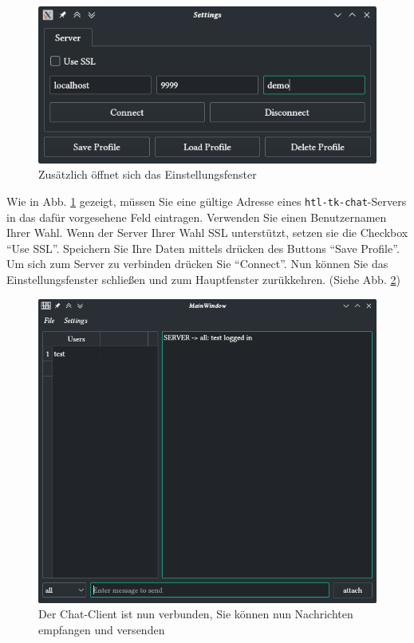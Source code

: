\documentclass[a4paper,ngerman,headsepline]{scrreprt}
\begin{document}
\begin{figure}[ht]\centering
\includegraphics[width=\textwidth]{images/settings}
\caption{Zusätzlich öffnet sich das Einstellungsfenster\label{fig:settings}}
\end{figure}\clearpage
Wie in Abb. \ref{fig:settings} gezeigt, müssen Sie eine gültige Adresse eines \texttt{htl-tk-chat}-Servers in das dafür vorgesehene Feld eintragen. Verwenden Sie einen Benutzernamen Ihrer Wahl. Wenn der Server Ihrer Wahl SSL unterstützt, setzen sie die Checkbox \enquote{Use SSL}.
Speichern Sie Ihre Daten mittels drücken des Buttons \enquote{Save Profile}. Um sich zum Server zu verbinden drücken Sie \enquote{Connect}. Nun können Sie das Einstellungsfenster schließen und zum Hauptfenster zurükkehren. (Siehe Abb. \ref{fig:alone})

\begin{figure}[ht]\centering
\includegraphics[width=\textwidth]{images/alone}
\caption{Der Chat-Client ist nun verbunden, Sie können nun Nachrichten empfangen und versenden \label{fig:alone}}
\end{figure}
\end{document}
